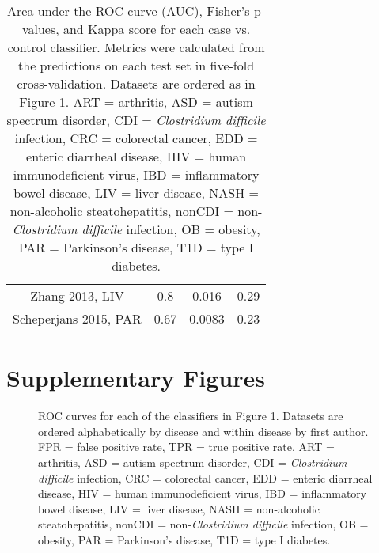 {\begin{table}[h]
\begin{center}
{\begin{tabular}{ c  c  c  c}
	Zhang 2013, LIV & 0.8 & 0.016 & 0.29 \\
	Scheperjans 2015, PAR & 0.67 & 0.0083 & 0.23 \\
	\hline
\end{tabular}}
\caption{Area under the ROC curve (AUC), Fisher's p-values, and Kappa score for each case vs. control classifier. Metrics were calculated from the predictions on each test set in five-fold cross-validation. Datasets are ordered as in Figure 1. ART = arthritis, ASD = autism spectrum disorder, CDI = \textit{Clostridium difficile} infection, CRC = colorectal cancer, EDD = enteric diarrheal disease, HIV = human immunodeficient virus, IBD = inflammatory bowel disease, LIV = liver disease, NASH = non-alcoholic steatohepatitis, nonCDI = non-\textit{Clostridium difficile} infection, OB = obesity, PAR = Parkinson's disease, T1D = type I diabetes.}\label{tab:kappa}
\end{center}
\end{table}
}

\FloatBarrier
\clearpage
\section{Supplementary Figures}

\newpage
\begin{figure}[h]
        \begin{center}
        \caption{ROC curves for each of the classifiers in Figure 1. Datasets are ordered alphabetically by disease and within disease by first author. FPR = false positive rate, TPR = true positive rate. ART = arthritis, ASD = autism spectrum disorder, CDI = \textit{Clostridium difficile} infection, CRC = colorectal cancer, EDD = enteric diarrheal disease, HIV = human immunodeficient virus, IBD = inflammatory bowel disease, LIV = liver disease, NASH = non-alcoholic steatohepatitis, nonCDI = non-\textit{Clostridium difficile} infection, OB = obesity, PAR = Parkinson's disease, T1D = type I diabetes.
}
        \label{fig:roc_curves}
        \end{center}
\end{figure}


